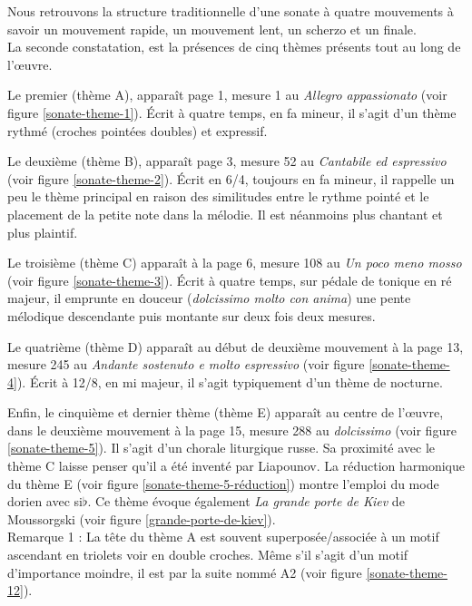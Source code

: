 Nous retrouvons la structure traditionnelle d'une sonate à quatre mouvements à savoir un mouvement rapide, un mouvement lent, un scherzo et un finale.\\

La seconde constatation, est la présences de cinq thèmes présents tout au long de l'œuvre.

Le premier (thème A), apparaît page 1, mesure 1 au \emph{Allegro appassionato} (voir figure \ref{sonate-theme-1}). Écrit à quatre temps, en fa mineur, il s'agit d'un thème rythmé (croches pointées doubles) et expressif.

Le deuxième (thème B), apparaît page 3, mesure 52 au \emph{Cantabile ed espressivo} (voir figure \ref{sonate-theme-2}). Écrit en 6/4, toujours en fa mineur, il rappelle un peu le thème principal en raison des similitudes entre le rythme pointé et le placement de la petite note dans la mélodie. Il est néanmoins plus chantant et plus plaintif.

Le troisième (thème C) apparaît à la page 6, mesure 108 au \emph{Un poco meno mosso} (voir figure \ref{sonate-theme-3}). Écrit à quatre temps, sur pédale de tonique en ré majeur, il emprunte en douceur (\emph{dolcissimo molto con anima}) une pente mélodique descendante puis montante sur deux fois deux mesures.

Le quatrième (thème D) apparaît au début de deuxième mouvement à la page 13, mesure 245 au \emph{Andante sostenuto e molto espressivo} (voir figure \ref{sonate-theme-4}). Écrit à 12/8, en mi majeur, il s'agit typiquement d'un thème de nocturne.

Enfin, le cinquième et dernier thème (thème E) apparaît au centre de l'œuvre, dans le deuxième mouvement à la page 15, mesure 288 au \emph{dolcissimo} (voir figure \ref{sonate-theme-5}). Il s'agit d'un chorale liturgique russe. Sa proximité avec le thème C laisse penser qu'il a été inventé par Liapounov. La réduction harmonique du thème E (voir figure \ref{sonate-theme-5-réduction}) montre l'emploi du mode dorien avec si$\flat$. Ce thème évoque également \emph{La grande porte de Kiev} de Moussorgski (voir figure \ref{grande-porte-de-kiev}).\\

Remarque 1 : La tête du thème A est souvent superposée/associée à un motif ascendant en triolets voir en double croches. Même s'il s'agit d'un motif d'importance moindre, il est par la suite nommé A2 (voir figure \ref{sonate-theme-12}).\\

